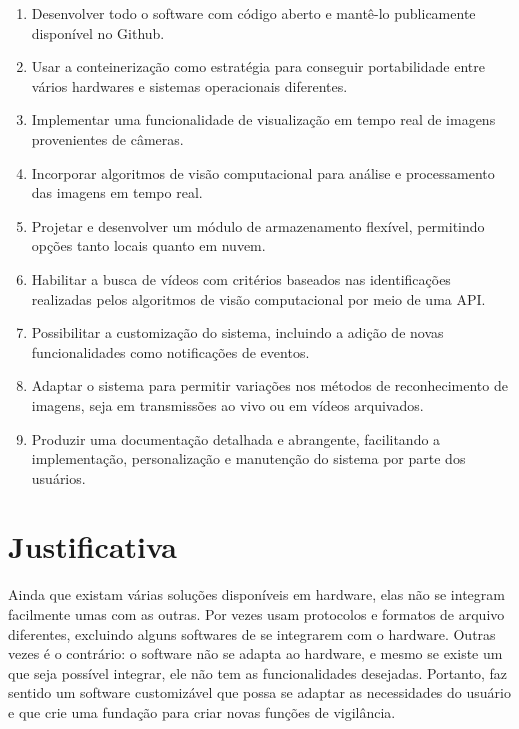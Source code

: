\documentclass[12pt, %
openright, 
oneside, %
a4paper,    %
brazil]{facom-ufu-abntex2}
\begin{document}
\begin{enumerate}
	\item Desenvolver todo o software com código aberto e mantê-lo
	      publicamente disponível no Github.
	\item Usar a conteinerização como estratégia para conseguir
	      portabilidade entre vários hardwares e sistemas operacionais diferentes.
	\item Implementar uma funcionalidade de visualização em tempo real de
	      imagens provenientes de câmeras.
	\item Incorporar algoritmos de visão computacional para análise e
	      processamento das imagens em tempo real.
	\item Projetar e desenvolver um módulo de armazenamento flexível,
	      permitindo opções tanto locais quanto em nuvem.
	\item Habilitar a busca de vídeos com critérios baseados nas
	      identificações realizadas pelos algoritmos de visão computacional por meio de
	      uma API.
	\item Possibilitar a customização do sistema, incluindo a adição de
	      novas funcionalidades como notificações de eventos.
	\item Adaptar o sistema para permitir variações nos métodos de
	      reconhecimento de imagens, seja em transmissões ao vivo ou em vídeos
	      arquivados.
	\item Produzir uma documentação detalhada e abrangente, facilitando a
	      implementação, personalização e manutenção do sistema por parte dos usuários.
\end{enumerate}

\section{Justificativa}

Ainda que existam várias soluções disponíveis em hardware, elas não se integram
facilmente umas com as outras. Por vezes usam protocolos e formatos de arquivo
diferentes, excluindo alguns softwares de se integrarem com o hardware. Outras
vezes é o contrário: o software não se adapta ao hardware, e mesmo se existe um
que seja possível integrar, ele não tem as funcionalidades desejadas. Portanto,
faz sentido um software customizável que possa se adaptar as necessidades do
usuário e que crie uma fundação para criar novas funções de vigilância.

\end{document}
